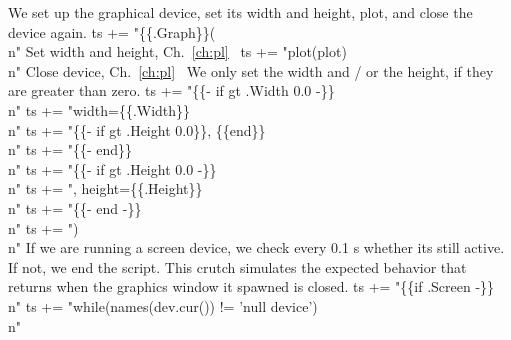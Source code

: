 We set up the graphical device, set its width and height, plot, and
close the device again.
\nwenddocs{}\endmoddef\nwstartdeflinemarkup{}\nwenddeflinemarkup
ts += "\{\{.Graph\}\}(\\n"
\LA{}Set width and height, Ch.~\ref{ch:pl}~{\nwtagstyle{}}\RA{}
ts += "plot(plot)\\n"
\LA{}Close device, Ch.~\ref{ch:pl}~{\nwtagstyle{}}\RA{}
\nwendcode{}\nwdocspar
We only set the width and / or the height, if they are greater than
zero.
\nwenddocs{}\endmoddef\nwstartdeflinemarkup{}\nwenddeflinemarkup
ts += "\{\{- if gt .Width 0.0 -\}\}\\n"
ts += "width=\{\{.Width\}\}\\n"
ts += "\{\{- if gt .Height 0.0\}\}, \{\{end\}\}\\n"
ts += "\{\{- end\}\}\\n"
ts += "\{\{- if gt .Height 0.0 -\}\}\\n"
ts += ", height=\{\{.Height\}\}\\n"
ts += "\{\{- end -\}\}\\n"
ts += ")\\n"
\nwendcode{}\nwdocspar
If we are running a screen device, we check every 0.1 s whether its
still active. If not, we end the script. This crutch simulates the
expected behavior that  returns when the graphics window
it spawned is closed.
\nwenddocs{}\endmoddef\nwstartdeflinemarkup{}\nwenddeflinemarkup
ts += "\{\{if .Screen -\}\}\\n"
ts += "while(names(dev.cur()) != 'null device')\\n"
